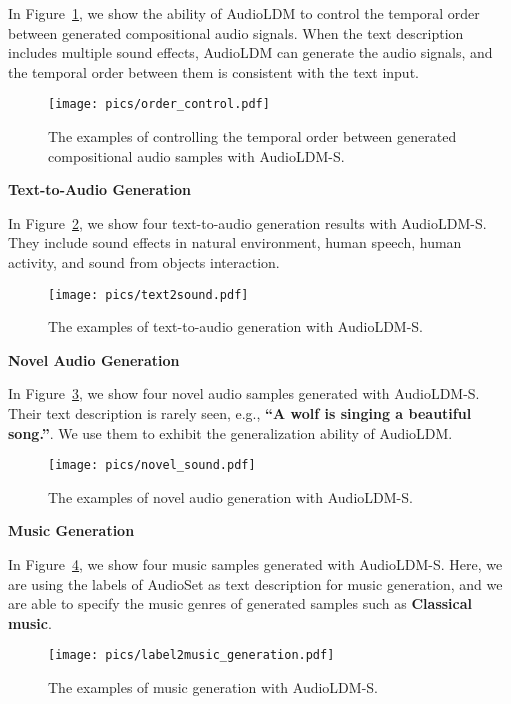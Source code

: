 \documentclass{article}
\begin{document}
In Figure~\ref{fig:temporalorder}, we show the ability of AudioLDM to control the temporal order between generated compositional audio signals. When the text description includes multiple sound effects, AudioLDM can generate the audio signals, and the temporal order between them is consistent with the text input.

\begin{figure}[H]
    \centering
    \texttt{[image: pics/order\_control.pdf]}
    \caption{The examples of controlling the temporal order between generated compositional audio samples with AudioLDM-S.}
    \label{fig:temporalorder}
\vspace{0.5cm}
\end{figure}


\textbf{Text-to-Audio Generation}

In Figure~\ref{fig:text-to-audio}, we show four text-to-audio generation results with AudioLDM-S. They include sound effects in natural environment, human speech, human activity, and sound from objects interaction.

\vspace{0.3cm}

\begin{figure}[H]
    \centering
    \texttt{[image: pics/text2sound.pdf]}
    \caption{The examples of text-to-audio generation with AudioLDM-S.}
    \label{fig:text-to-audio}
\vspace{0.6cm}
\end{figure}


\textbf{Novel Audio Generation}

In Figure~\ref{fig:novel-audio}, we show four novel audio samples generated with AudioLDM-S. Their text description is rarely seen, e.g., \textbf{``A wolf is singing a beautiful song.''}. We use them to exhibit the generalization ability of AudioLDM.
\vspace{0.3cm}

\begin{figure}[H]
    \centering
    \texttt{[image: pics/novel\_sound.pdf]}
    \caption{The examples of novel audio generation with AudioLDM-S.}
    \label{fig:novel-audio}
\end{figure}

\newpage

\textbf{Music Generation}

In Figure~\ref{fig:demo-audioset-music}, we show four music samples generated with AudioLDM-S. Here, we are using the labels of AudioSet as text description for music generation, and we are able to specify the music genres of generated samples such as \textbf{Classical music}.


\begin{figure}[H]
    \centering
    \texttt{[image: pics/label2music\_generation.pdf]}
    \caption{The examples of music generation with AudioLDM-S.}
    \label{fig:demo-audioset-music}
\end{figure}










\newpage
\end{document}

